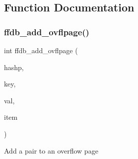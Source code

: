\subsection{Function Documentation}
\mbox{\label{adat-devel_2other__libs_2filedb_2filehash_2ffdb__page_8c_a4c01318294eb0c4c8414f1a48a4e2ca4}} 
\subsubsection{\texorpdfstring{ffdb\_add\_ovflpage()}{ffdb\_add\_ovflpage()}}
{\footnotesize\ttfamily int ffdb\+\_\+add\+\_\+ovflpage (\begin{DoxyParamCaption}\item[{\mbox{\hyperlink{adat-devel_2other__libs_2filedb_2filehash_2ffdb__hash_8h_ae592010ed2bedc975d3cc0b7d074b9d1}{ffdb\+\_\+htab\+\_\+t}} $\ast$}]{hashp,  }\item[{\mbox{\hyperlink{adat-devel_2other__libs_2filedb_2filehash_2ffdb__db_8h_aa2e0984399491df0fdd20898ca8758f9}{F\+F\+D\+B\+\_\+\+D\+BT}} $\ast$}]{key,  }\item[{const \mbox{\hyperlink{adat-devel_2other__libs_2filedb_2filehash_2ffdb__db_8h_aa2e0984399491df0fdd20898ca8758f9}{F\+F\+D\+B\+\_\+\+D\+BT}} $\ast$}]{val,  }\item[{\mbox{\hyperlink{adat-devel_2other__libs_2filedb_2filehash_2ffdb__hash_8h_aa1cea5ccbd6513ed152988f7a71a936d}{ffdb\+\_\+hent\+\_\+t}} $\ast$}]{item }\end{DoxyParamCaption})}

Add a pair to an overflow page \mbox{\label{adat-devel_2other__libs_2filedb_2filehash_2ffdb__page_8c_a9f4cca81e82f747a9f92160b9d1f421b}} 
